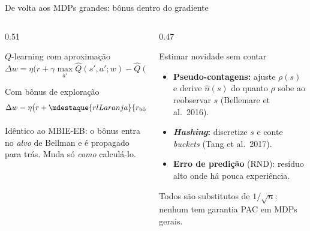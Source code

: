 \documentclass[aspectratio=169, 11pt]{beamer}
\begin{document}
\begin{frame}{De volta aos MDPs grandes: bônus dentro do gradiente}
  \begin{columns}[T]
    \begin{column}{0.51\textwidth}
      \begin{defbox}{$Q$-learning com aproximação}
        \[
          \Delta w = \eta \bigl( r + \gamma \max_{a'}\hat{Q}(s',a';w) - \hat{Q}(s,a;w)\bigr)
                     \nabla_w \hat{Q}
        \]
      \end{defbox}
      \begin{algbox}{Com bônus de exploração}
        \[
          \Delta w = \eta \bigl( r
          + \mdestaque{rlLaranja}{r_{\text{bônus}}(s,a)}
          + \gamma \max_{a'}\hat{Q}(s',a';w) - \hat{Q}(s,a;w)\bigr)
          \nabla_w \hat{Q}
        \]
      \end{algbox}
      {\small\color{rlCinza} Idêntico ao MBIE-EB: o bônus entra no \emph{alvo} de
      Bellman e é propagado para trás. Muda só \emph{como} calculá-lo.}
    \end{column}
    \begin{column}{0.47\textwidth}
      \begin{teobox}{Estimar novidade sem contar}
        \begin{itemize}
          \item \textbf{Pseudo-contagens:} ajuste $\rho(s)$ e derive $\hat{n}(s)$ do
                quanto $\rho$ sobe ao reobservar $s$ (Bellemare et al.\ 2016).
          \item \textbf{\textit{Hashing}:} discretize $s$ e conte \textit{buckets}
                (Tang et al.\ 2017).
          \item \textbf{Erro de predição} (RND): resíduo alto onde há pouca experiência.
        \end{itemize}
      \end{teobox}
      \begin{alertabox}
        Todos são substitutos de $1/\sqrt{n}$; nenhum tem garantia PAC em MDPs gerais.
      \end{alertabox}
    \end{column}
  \end{columns}
\end{frame}
\end{document}
